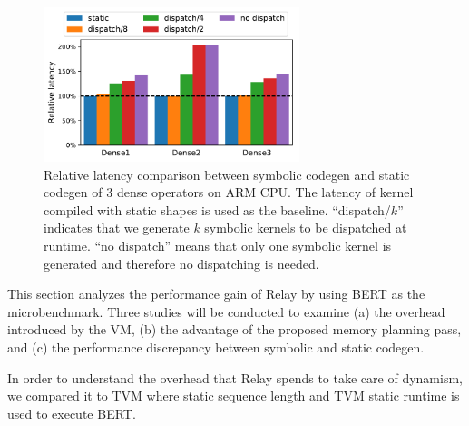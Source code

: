     \begin{figure}[t]
        \centering
        \includegraphics[height=4.5cm]{figs/sym_codegen.pdf}
        \caption{Relative latency comparison between symbolic codegen and static codegen of 3 dense operators on ARM CPU. The latency of kernel compiled with static shapes is used as the baseline. ``dispatch/$k$'' indicates that we generate $k$ symbolic kernels to be dispatched at runtime. ``no dispatch'' means that only one symbolic kernel is generated and therefore no dispatching is needed. %
        }
        \label{fig:sym-codegen}
    \end{figure}

    This section analyzes the performance gain of Relay by using BERT as the microbenchmark. Three studies will be conducted to examine (a) the overhead introduced by the VM, %
    (b) the advantage of the proposed memory planning pass, and (c) the performance discrepancy between symbolic and static codegen.

     In order to understand the overhead that Relay spends to take care of dynamism, we compared it to TVM where static sequence length and TVM static runtime is used to execute BERT.
